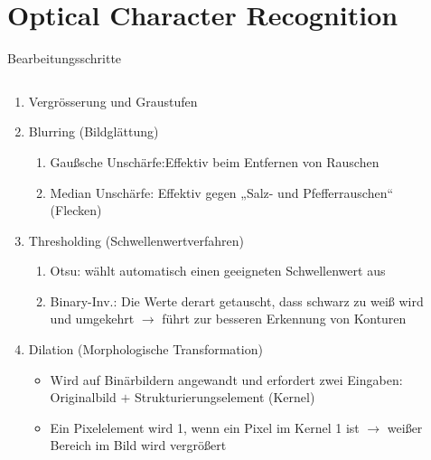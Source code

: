 \section{Optical Character Recognition}

\begin{frame}{Bearbeitungsschritte}
\begin{columns}
\begin{column}{0.6\textwidth}
\begin{enumerate}
\item {\scriptsize Vergr\"osserung und Graustufen}
\item {\scriptsize Blurring (Bildgl\"attung)}
\begin{enumerate}
\item {\tiny Gaußsche Unsch\"arfe:Effektiv beim Entfernen von Rauschen} 
\item {\tiny Median Unschärfe: Effektiv gegen „Salz- und Pfefferrauschen“ (Flecken)}
\end{enumerate}
\item {\scriptsize Thresholding (Schwellenwertverfahren)}
\begin{enumerate}
\item {\tiny Otsu: w\"ahlt automatisch einen geeigneten Schwellenwert aus}
\item {\tiny Binary-Inv.: Die Werte derart getauscht, dass schwarz zu weiß wird und umgekehrt $\rightarrow$ führt zur besseren Erkennung von Konturen}
\end{enumerate}
\item {\scriptsize Dilation (Morphologische Transformation)}
\begin{itemize}
\item {\tiny Wird auf Binärbildern angewandt und erfordert zwei Eingaben: Originalbild $+$ Strukturierungselement (Kernel)}
\item {\tiny Ein Pixelelement wird 1, wenn ein Pixel im Kernel 1 ist $\rightarrow$ weißer Bereich im Bild wird vergrößert}
\end{itemize}
\end{enumerate}
\end{column}
\begin{column}{0.40\textwidth}
    \begin{center}

\end{center}
\end{column}
\end{columns}
\end{frame}
